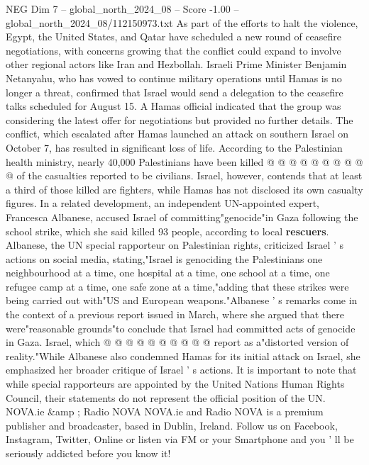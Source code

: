 \begin{textsample}{NEG Dim 7 – global\_north\_2024\_08 – Score -1.00 – global\_north\_2024\_08/112150973.txt}
As part of the efforts to halt the violence, Egypt, the United States, and Qatar have scheduled a new round of ceasefire negotiations, with concerns growing that the conflict could expand to involve other regional actors like Iran and Hezbollah.
Israeli Prime Minister Benjamin Netanyahu, who has vowed to continue military operations until Hamas is no longer a threat, confirmed that Israel would send a delegation to the ceasefire talks scheduled for August 15.
A Hamas official indicated that the group was considering the latest offer for negotiations but provided no further details.
The conflict, which escalated after Hamas launched an attack on southern Israel on October 7, has resulted in significant loss of life.
According to the Palestinian health ministry, nearly 40,000 Palestinians have been killed @ @ @ @ @ @ @ @ @ @ of the casualties reported to be civilians.
Israel, however, contends that at least a third of those killed are fighters, while Hamas has not disclosed its own casualty figures.
In a related development, an independent UN-appointed expert, Francesca Albanese, accused Israel of committing"genocide"in Gaza following the school strike, which she said killed 93 people, according to local \textbf{rescuers}.
Albanese, the UN special rapporteur on Palestinian rights, criticized Israel ' s actions on social media, stating,"Israel is genociding the Palestinians one neighbourhood at a time, one hospital at a time, one school at a time, one refugee camp at a time, one safe zone at a time,"adding that these strikes were being carried out with"US and European weapons."Albanese ' s remarks come in the context of a previous report issued in March, where she argued that there were"reasonable grounds"to conclude that Israel had committed acts of genocide in Gaza.
Israel, which @ @ @ @ @ @ @ @ @ @ report as a"distorted version of reality."While Albanese also condemned Hamas for its initial attack on Israel, she emphasized her broader critique of Israel ' s actions.
It is important to note that while special rapporteurs are appointed by the United Nations Human Rights Council, their statements do not represent the official position of the UN.
NOVA.ie \&amp ; Radio NOVA NOVA.ie and Radio NOVA is a premium publisher and broadcaster, based in Dublin, Ireland.
Follow us on Facebook, Instagram, Twitter, Online or listen via FM or your Smartphone and you ' ll be seriously addicted before you know it!

\end{textsample}
